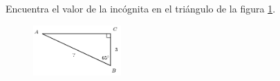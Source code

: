 Encuentra el valor de la incógnita en el triángulo de la figura \ref{fig:lados_functrig_16}.
\begin{figure}[H]
    \begin{center}
        \includegraphics[width=0.3\textwidth]{../images/lados_functrig_16.png}
    \end{center}
    \caption{}
    \label{fig:lados_functrig_16}
\end{figure}